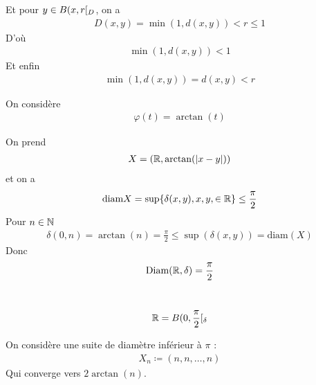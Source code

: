 \documentclass[french,a4paper,10pt]{article}
\begin{document}
\begin{td-sol}
\begin{enumerate}
				Et pour $y\in B({x,r}\mathopen{}[\mathclose{}_D$, on a
					\[\begin{gathered}
						D(x,y)=\min(1,d(x,y))<r\le 1
					\end{gathered}\]
				D'où
					\[\begin{aligned}
						\min(1,d(x,y))<1
					\end{aligned}\]
				Et enfin
					\[\begin{aligned}
						\min(1,d(x,y))=d(x,y)<r
					\end{aligned}\]
		\end{enumerate}
	\end{td-sol}
	\begin{td-exo}
		On considère 
			\[\begin{aligned}
				\varphi(t)=\arctan(t)
			\end{aligned}\]
	\end{td-exo}

	\begin{td-sol}
		On prend 
			\[\begin{gathered}
				X=\left(\mathbb{R},\arctan(|x-y|)\right)
			\end{gathered}\]
		et on a
			\[\begin{gathered}
				\text{diam} X=\sup\{\delta(x,y),x,y,\in\mathbb{R}\}\le\frac\pi2
			\end{gathered}\]
		Pour $n\in\mathbb{N}$
			\[\begin{gathered}
				\delta(0,n)=\arctan(n)=\frac\pi2\le\sup(\delta(x,y))=\text{diam}(X)
			\end{gathered}\]
		Donc
			\[\begin{aligned}
				\text{Diam}(\mathbb{R},\delta)=\frac\pi2
			\end{aligned}\]
		\begin{no-num-remark}\,
			\[\begin{aligned}
				\mathbb{R}=B({0,\frac\pi2}\mathopen{}[\mathclose{}_\delta
			\end{aligned}\]
			
		\end{no-num-remark}
		On considère une suite de diamètre inférieur à $\pi$ : 
			\[\begin{aligned}
				X_n\coloneq (n,n,\dots,n)
			\end{aligned}\]
		Qui converge vers $2\arctan(n)$.
	\end{td-sol}
	
\end{document}
